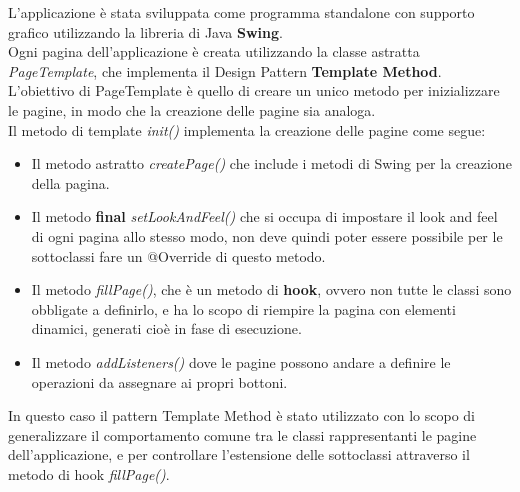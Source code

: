 L'applicazione è stata sviluppata come programma standalone con supporto grafico utilizzando la libreria di Java
\textbf{Swing}. \\
Ogni pagina dell'applicazione è creata utilizzando la classe astratta \textit{PageTemplate}, che implementa il
Design Pattern \textbf{Template Method}\cite{GoF}. \\
L'obiettivo di PageTemplate è quello di creare un unico metodo per inizializzare le pagine, in modo che la creazione
delle pagine sia analoga. \\
Il metodo di template \textit{init()} implementa la creazione delle pagine come segue:
\begin{itemize}
    \item Il metodo astratto \textit{createPage()} che include i metodi di Swing per la creazione della pagina.
    \item Il metodo \textbf{final} \textit{setLookAndFeel()} che si occupa di impostare il look and feel di ogni pagina
    allo stesso modo, non deve quindi poter essere possibile per le sottoclassi fare un @Override di questo metodo.
    \item Il metodo \textit{fillPage()}, che è un metodo di \textbf{hook}, ovvero non tutte le classi sono obbligate a
    definirlo, e ha lo scopo di riempire la pagina con elementi dinamici, generati cioè in fase di esecuzione.
    \item Il metodo \textit{addListeners()} dove le pagine possono andare a definire le operazioni da assegnare ai
    propri bottoni.
\end{itemize}

In questo caso il pattern Template Method è stato utilizzato con lo scopo di generalizzare il comportamento comune
tra le classi rappresentanti le pagine dell'applicazione, e per controllare l'estensione delle sottoclassi attraverso
il metodo di hook \textit{fillPage()}.

